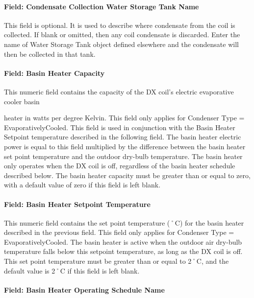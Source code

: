 \paragraph{Field: Condensate Collection Water Storage Tank Name}\label{field-condensate-collection-water-storage-tank-name-6}

This field is optional. It is used to describe where condensate from the coil is collected. If blank or omitted, then any coil condensate is discarded. Enter the name of Water Storage Tank object defined elsewhere and the condensate will then be collected in that tank.

\paragraph{Field: Basin Heater Capacity}\label{field-basin-heater-capacity-4}

This numeric field contains the capacity of the DX coil's electric evaporative cooler basin

heater in watts per degree Kelvin. This field only applies for Condenser Type = EvaporativelyCooled. This field is used in conjunction with the Basin Heater Setpoint temperature described in the following field. The basin heater electric power is equal to this field multiplied by the difference between the basin heater set point temperature and the outdoor dry-bulb temperature. The basin heater only operates when the DX coil is off, regardless of the basin heater schedule described below. The basin heater capacity must be greater than or equal to zero, with a default value of zero if this field is left blank.

\paragraph{Field: Basin Heater Setpoint Temperature}\label{field-basin-heater-setpoint-temperature-4}

This numeric field contains the set point temperature (˚C) for the basin heater described in the previous field. This field only applies for Condenser Type = EvaporativelyCooled. The basin heater is active when the outdoor air dry-bulb temperature falls below this setpoint temperature, as long as the DX coil is off. This set point temperature must be greater than or equal to 2˚C, and the default value is 2˚C if this field is left blank.

\paragraph{Field: Basin Heater Operating Schedule Name}\label{field-basin-heater-operating-schedule-name-4}

